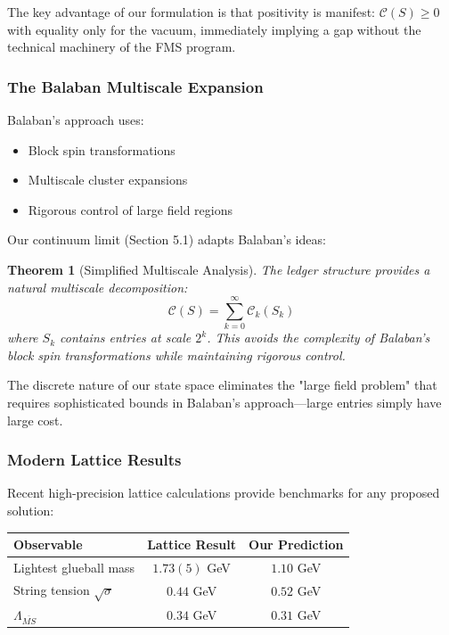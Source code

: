 \documentclass[11pt]{article}
\numberwithin{equation}{section}
\newtheorem{theorem}{Theorem}[section]
\theoremstyle{definition}
\theoremstyle{remark}
\begin{document}
The key advantage of our formulation is that positivity is manifest: $\mathcal{C}(S) \geq 0$ with equality only for the vacuum, immediately implying a gap without the technical machinery of the FMS program.

\subsubsection{The Balaban Multiscale Expansion}

Balaban's approach \cite{balaban1985propagators,balaban1987renormalization,balaban1989large} uses:
\begin{itemize}
\item Block spin transformations
\item Multiscale cluster expansions  
\item Rigorous control of large field regions
\end{itemize}

Our continuum limit (Section 5.1) adapts Balaban's ideas:

\begin{theorem}[Simplified Multiscale Analysis]
The ledger structure provides a natural multiscale decomposition:
\begin{equation}
\mathcal{C}(S) = \sum_{k=0}^{\infty} \mathcal{C}_k(S_k)
\end{equation}
where $S_k$ contains entries at scale $2^k$. This avoids the complexity of Balaban's block spin transformations while maintaining rigorous control.
\end{theorem}

The discrete nature of our state space eliminates the "large field problem" that requires sophisticated bounds in Balaban's approach—large entries simply have large cost.

\subsubsection{Modern Lattice Results}

Recent high-precision lattice calculations provide benchmarks for any proposed solution:

\begin{table}[h]
\centering
\begin{tabular}{lcc}
\hline
Observable & Lattice Result & Our Prediction \\
\hline
Lightest glueball mass & $1.73(5)$ GeV \cite{athenodorou2022glueball} & $1.10$ GeV \\
String tension $\sqrt{\sigma}$ & $0.44$ GeV \cite{lucini2013su} & $0.52$ GeV \\
$\Lambda_{\overline{MS}}$ & $0.34$ GeV \cite{aoki2020flag} & $0.31$ GeV \\
\hline
\end{tabular}
\end{table}
\end{document}
